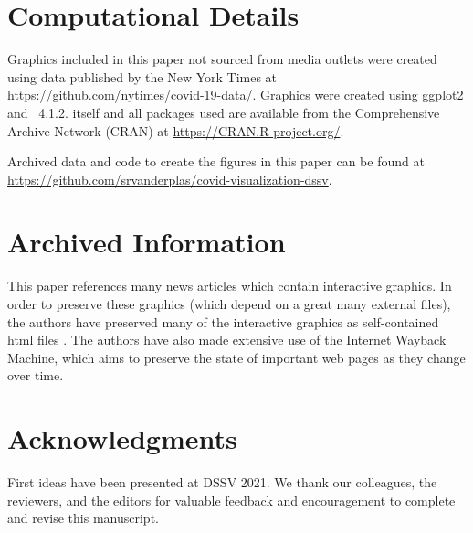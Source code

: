\documentclass[article]{jdssv}\usepackage[]{graphicx}\usepackage[]{color}
\begin{document}

\newpage
\section*{Computational Details}
Graphics included in this paper not sourced from media outlets were created using data published by the New York Times at \url{https://github.com/nytimes/covid-19-data/}. Graphics were created using ggplot2 \citep{ggplot2} and ~4.1.2.  itself and all packages used are available from the Comprehensive  Archive Network (CRAN) at \url{https://CRAN.R-project.org/}.

Archived data and code to create the figures in this paper can be found at \url{https://github.com/srvanderplas/covid-visualization-dssv}.

\section*{Archived Information}
This paper references many news articles which contain interactive graphics. In order to preserve these graphics (which depend on a great many external files), the authors have preserved many of the interactive graphics as self-contained html files \citep{news-file-archive}. 
The authors have also made extensive use of the Internet Wayback Machine, which aims to preserve the state of important web pages as they change over time.

\section*{Acknowledgments}

First ideas have been presented at DSSV 2021. We thank our colleagues, the reviewers, and the editors for valuable feedback and encouragement to complete and revise this manuscript.

\end{document}
